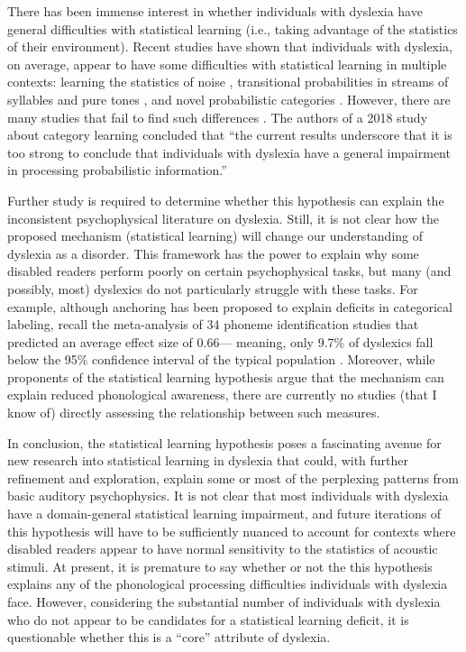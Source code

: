\documentclass[../uwthesis.tex]{subfiles}
\begin{document}
There has been immense interest in whether individuals with dyslexia have general difficulties with statistical learning (i.e., taking advantage of the statistics of their environment).
Recent studies have shown that individuals with dyslexia, on average, appear to have some
difficulties with statistical learning in multiple contexts: learning the statistics of noise \citep{Agus2013}, transitional probabilities in streams of
syllables and pure tones \citep{Jaffe-Dax2016}, and novel probabilistic categories \citep{Gabay2015}. However, there are many studies that fail to find such differences \citep{Gabay2018,Staels2015NoDyslexia,Gould1990DoDeficit,Inacio2018ImplicitChildren,Jimenez-Fernandez2011DyslexicCueing,Samara2017ArtificialLearning,Du2013ImplicitInformation}.  The authors of a 2018 study about category learning \citep{Gabay2018} concluded that “the current results underscore that it is too strong to conclude that individuals with
dyslexia have a general impairment in processing probabilistic information.”

Further study is required to determine whether this hypothesis can explain the inconsistent psychophysical literature on dyslexia. Still, it is not clear how the proposed mechanism (statistical learning) will change our understanding of dyslexia as a disorder. This framework has the power to explain why some disabled readers perform poorly on certain psychophysical tasks, but many (and possibly, most) dyslexics do not particularly struggle with these tasks. For example, although anchoring has been proposed to explain deficits in categorical labeling, recall the meta-analysis of 34 phoneme identification studies that predicted an average effect size of 0.66— meaning, only 9.7\% of dyslexics fall below the 95\% confidence interval of the typical population \citep{Noordenbos2015}. Moreover, while proponents of the statistical learning hypothesis argue that the mechanism can explain reduced phonological awareness, there are currently no studies (that I know of) directly assessing the relationship between such measures. 

In conclusion, the statistical learning hypothesis poses a fascinating avenue for new research
into statistical learning in dyslexia that could, with further refinement and exploration,
explain some or most of the perplexing patterns from basic auditory psychophysics. It is not
clear that most individuals with dyslexia have a domain-general statistical learning impairment, and future iterations of this hypothesis will have to be sufficiently nuanced to account for contexts where disabled readers appear to have normal sensitivity to the statistics of acoustic stimuli. At present, it is premature to say whether or not the this hypothesis explains any of the phonological processing difficulties individuals with dyslexia face. However, considering the substantial number of individuals with dyslexia who do not appear to be candidates for a statistical learning deficit, it is questionable whether this is a “core” attribute of dyslexia.
\end{document}
